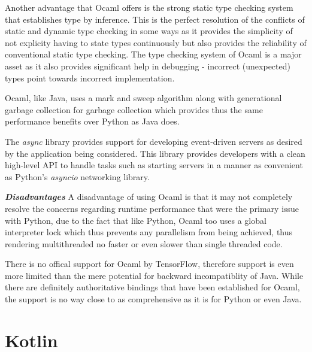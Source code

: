 \noindent Another advantage that Ocaml offers is the strong static type checking system that establishes type by inference. This is the perfect resolution of the conflicts of static and dynamic type checking in some ways as it provides the simplicity of not explicity having to state types continuously but also provides the reliability of conventional static type checking. The type checking system of Ocaml is a major asset as it also provides significant help in debugging - incorrect (unexpected) types point towards incorrect implementation. \newline

\noindent Ocaml, like Java, uses a mark and sweep algorithm along with generational garbage collection for garbage collection which provides thus the same performance benefits over Python as Java does. \newline

\noindent The \emph{async} library provides support for developing event-driven servers as desired by the application being considered. This library provides developers with a clean high-level API to handle tasks such as starting servers in a manner as convenient as Python's \emph{asyncio} networking library. \newline

\noindent \textbf{\textit{Disadvantages}}\newline
\noindent A disadvantage of using Ocaml is that it may not completely resolve the concerns regarding runtime performance that were the primary issue with Python, due to the fact that like Python, Ocaml too uses a global interpreter lock which thus prevents any parallelism from being achieved, thus rendering multithreaded no faster or even slower than single threaded code. \newline

\noindent There is no offical support for Ocaml by TensorFlow, therefore support is even more limited than the mere potential for backward incompatiblity of Java. While there are definitely authoritative bindings that have been established for Ocaml, the support is no way close to as comprehensive as it is for Python or even Java. 

\section{Kotlin}

